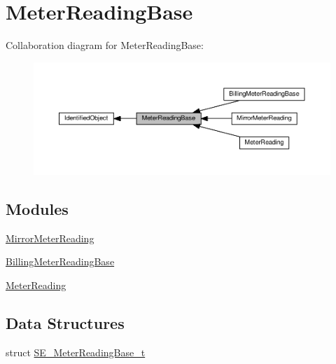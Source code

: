 \hypertarget{group__MeterReadingBase}{}\section{Meter\+Reading\+Base}
\label{group__MeterReadingBase}
Collaboration diagram for Meter\+Reading\+Base\+:\nopagebreak
\begin{figure}[H]
\begin{center}
\leavevmode
\includegraphics[width=350pt]{group__MeterReadingBase}
\end{center}
\end{figure}
\subsection*{Modules}
\begin{DoxyCompactItemize}
\item 
\hyperlink{group__MirrorMeterReading}{Mirror\+Meter\+Reading}
\item 
\hyperlink{group__BillingMeterReadingBase}{Billing\+Meter\+Reading\+Base}
\item 
\hyperlink{group__MeterReading}{Meter\+Reading}
\end{DoxyCompactItemize}
\subsection*{Data Structures}
\begin{DoxyCompactItemize}
\item 
struct \hyperlink{structSE__MeterReadingBase__t}{S\+E\+\_\+\+Meter\+Reading\+Base\+\_\+t}
\end{DoxyCompactItemize}
